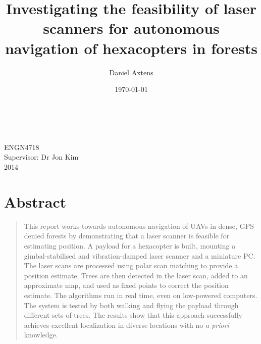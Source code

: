 \documentclass[12pt,oneside,a4paper]{book}
\title{Investigating the feasibility of laser scanners for autonomous
  navigation of hexacopters in forests}
\author{Daniel Axtens}
\date{\today}
\begin{document}
\pagestyle{empty}
\thispagestyle{empty}

\begin{titlepage}
  \enlargethispage{2cm}
  \begin{center}
    \makeatletter
    \Huge\textbf{\@title} \\[2.9cm]
    \huge\textbf{\@author} \\[10.5cm]
    \makeatother
    \LARGE ENGN4718\\
    Supervisor: Dr Jon Kim\\[2cm]
    2014
  \end{center}
\end{titlepage}


%

%

%

\cleardoublepage
\pagestyle{headings}
%

\section*{\centering Abstract}
\label{sec:abstract}

\begin{quote}
  This report works towards autonomous navigation of UAVs in dense,
  GPS denied forests by demonstrating that a laser scanner is feasible
  for estimating position. A payload for a hexacopter is built,
  mounting a gimbal-stabilised and vibration-damped laser scanner and
  a miniature PC. The laser scans are processed using polar scan
  matching to provide a position estimate. Trees are then detected in
  the laser scan, added to an approximate map, and used as fixed
  points to correct the position estimate. The algorithms run in real
  time, even on low-powered computers. The system is tested by both
  walking and flying the payload through different sets of trees. The
  results show that this approach successfully achieves excellent
  localization in diverse locations with no \emph{a priori}
  knowledge.
\end{quote}
\end{document}
